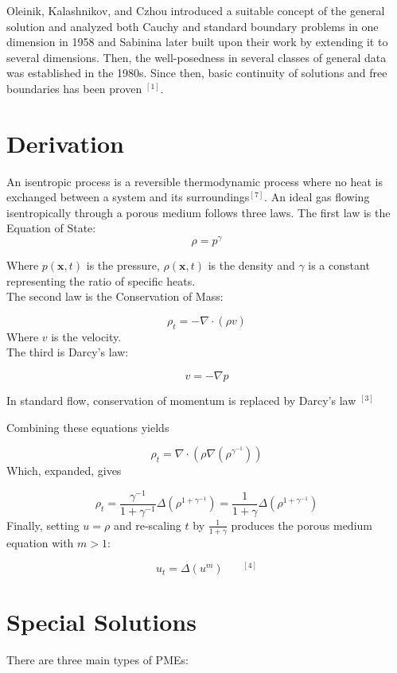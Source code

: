 \documentclass[paper=a4, fontsize=12pt]{scrartcl} %
\numberwithin{equation}{section} %
\numberwithin{table}{section} %
\begin{document}
Oleinik, Kalashnikov, and Czhou introduced a suitable concept of the general solution and analyzed both Cauchy and standard boundary problems in one dimension in 1958 and Sabinina later built upon their work by extending it to several dimensions. Then, the well-posedness in several classes of general data was established in the 1980s. Since then, basic continuity of solutions and free boundaries has been proven $^{[1]}$. 
\section{Derivation}
An isentropic process is a reversible thermodynamic process where no heat is exchanged between a system and its surroundings$^{[7]}$. An ideal gas flowing isentropically through a porous medium follows three laws. The first law is the Equation of State:
\begin{equation}
	\rho = p^\gamma
\end{equation}

Where $p(\mathbf{x},t)$ is the pressure, $\rho(\mathbf{x},t)$ is the density and $\gamma$ is a constant representing the ratio of specific heats.\\
The second law is the Conservation of Mass: 

\begin{equation}
	\rho_t = -\nabla\cdot(\rho v)
\end{equation}
Where $v$ is the velocity.\\
The third is Darcy's law:

\begin{equation}
	v = - \nabla p
\end{equation} 

In standard flow, conservation of momentum is replaced by Darcy's law $^{[3]}$

Combining these equations yields

 $$\rho_t = \nabla\cdot(\rho\nabla(\rho^{\gamma^{-1}}))$$
Which, expanded, gives 

$$\rho_t = \frac{\gamma^{-1}}{1+\gamma^{-1}}\Delta(\rho^{1+\gamma^{-1}}) = \frac{1}{1 +\gamma}\Delta (\rho^{1+\gamma^{-1}})$$
Finally, setting $u = \rho$ and re-scaling $t$ by $\frac{1}{1+\gamma}$ produces the porous medium equation with $m> 1$:

\begin{equation}
	u_t = \Delta(u^m)~~~~~~~~^{[4]}
\end{equation}


 
\section{Special Solutions}
There are three main types of PMEs:
\end{document}
